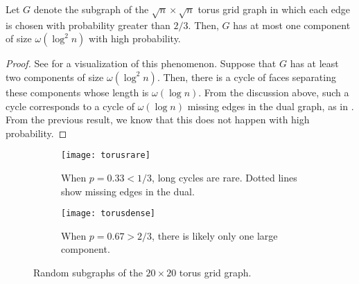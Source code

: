 \begin{thm}
  Let $G$ denote the subgraph of the $\sqrt{n} \times \sqrt{n}$ torus
  grid graph in which each edge is chosen with probability greater
  than $2/3$. Then, $G$ has at most one component of size
  $\omega(\log^2 n)$ with high probability.
\end{thm}
\begin{proof}
  See  for a visualization of this phenomenon. Suppose
  that $G$ has at least two components of size $\omega(\log^2
  n)$. Then, there is a cycle of faces separating these components
  whose length is $\omega(\log n)$. From the discussion above, such a
  cycle corresponds to a cycle of $\omega(\log n)$ missing edges in
  the dual graph, as in . From the previous
  result, we know that this does not happen with high probability.
\end{proof}

\begin{figure}
  \centering
  \begin{subfigure}[t]{0.4\textwidth}
    \texttt{[image: torusrare]}
    \caption{When $p = 0.33 < 1/3$, long cycles are rare. Dotted lines show
      missing edges in the dual.}
  \end{subfigure}
  \quad\quad
  \begin{subfigure}[t]{0.4\textwidth}
    \texttt{[image: torusdense]}
    \caption{When $p = 0.67 > 2/3$, there is likely only one large
      component.}
  \end{subfigure}
  \caption{Random subgraphs of the $20 \times 20$ torus grid graph.}
\end{figure}

%
%
%


